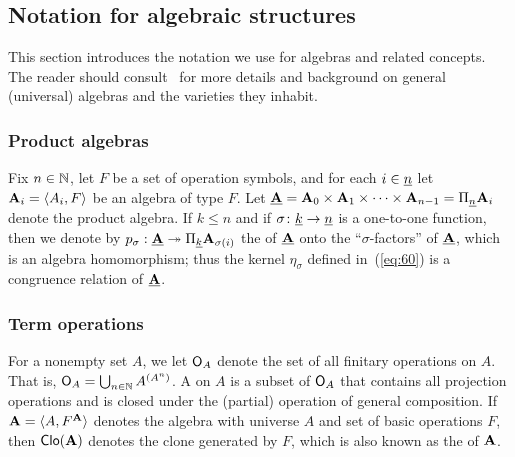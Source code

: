 \subsection{Notation for algebraic structures}
This section introduces the notation we use for algebras and related concepts.
The reader should consult~\cite{MR2839398} for more details and background 
on general (universal) algebras and the varieties they inhabit.

\subsubsection{Product algebras}
Fix $n\in \mathbb{N}$, let $F$ be a set of operation symbols, and for each $i\in \underline{n}$
let $\mathbf{A}_i = \langle A_i, F\rangle$ be an algebra of type $F$.
Let $\underline{\mathbf{A}} = \mathbf{A}_0 \times \mathbf{A}_1 \times \cdots \times \mathbf{A}_{n-1}= \Pi_{\underline{n}} \mathbf{A}_i$
denote the product algebra.
If $k \leq n$ and if $\sigma \colon \underline{k}\to \underline{n}$ is a one-to-one function, then
we denote by
$p_\sigma : \underline{\mathbf{A}} \twoheadrightarrow \Pi_{\underline{k}}\mathbf{A}_{\sigma(i)}$
the  of $\underline{\mathbf{A}}$ onto the 
``$\sigma$-factors'' %
of $\underline{\mathbf{A}}$,
which is an algebra homomorphism; thus the kernel $\eta_\sigma$ defined
in~(\ref{eq:60}) is a congruence relation of $\underline{\mathbf{A}}$.   


\subsubsection{Term operations}
\label{ssec:term-ops}
For a nonempty set $A$, we let $\mathsf{O}_A$ denote the set of all finitary
operations on $A$. That is, $\mathsf{O}_A = \bigcup_{n\in \mathbb{N}}A^{(A^n)}$.
A  on $A$ is a subset of $\mathsf{O}_A$ that contains all
projection operations and is closed under the (partial) operation of general
composition. 
If $\mathbf{A} = \langle A, F^{\mathbf{A}}\rangle$ denotes the algebra with universe $A$ and set of basic
operations $F$, then $\operatorname{\mathsf{Clo}} (\mathbf{A})$ denotes the clone generated by
$F$, which is also known as the  of $\mathbf{A}$.

